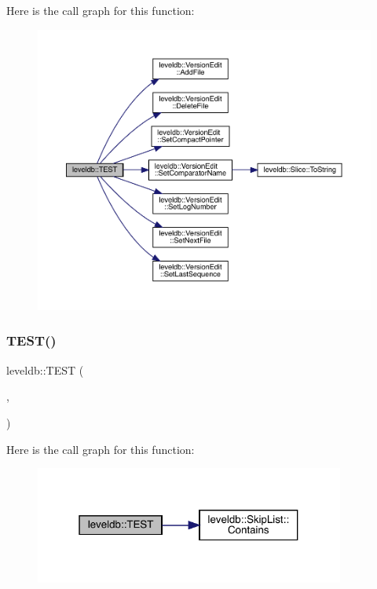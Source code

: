 Here is the call graph for this function\+:
\nopagebreak
\begin{figure}[H]
\begin{center}
\leavevmode
\includegraphics[width=350pt]{namespaceleveldb_aa3106d7d6e907fc13c8c7ceed76740ad_cgraph}
\end{center}
\end{figure}
\mbox{\label{namespaceleveldb_a94b31a20798f6d72a6cd11c328fcaba7}} 
\subsubsection{\texorpdfstring{TEST()}{TEST()}\hspace{0.1cm}{\footnotesize\ttfamily [3/102]}}
{\footnotesize\ttfamily leveldb\+::\+T\+E\+ST (\begin{DoxyParamCaption}\item[{\mbox{\hyperlink{classleveldb_1_1_skip_test}{Skip\+Test}}}]{,  }\item[{Empty}]{ }\end{DoxyParamCaption})}

Here is the call graph for this function\+:
\nopagebreak
\begin{figure}[H]
\begin{center}
\leavevmode
\includegraphics[width=289pt]{namespaceleveldb_a94b31a20798f6d72a6cd11c328fcaba7_cgraph}
\end{center}
\end{figure}
\mbox{\label{namespaceleveldb_a0cb5db14747e016f18aa8684a485bc00}} 
